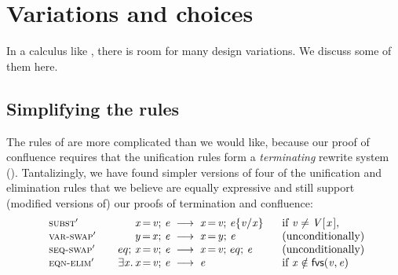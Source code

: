 \documentclass[acmsmall]{acmart}
\newcommand{\Conid}[1]{\mathit{#1}}
\newcommand{\Varid}[1]{\mathit{#1}}
\newcommand{\vs}{\emph{vs.}\xspace}
\newcommand{\lennart}[1]{{\color{dkcyan} [{LA}: #1]}}
\newcommand{\lennart}[1]{}
\begin{document}

\section{Variations and choices} \label{sec:variations}


In a calculus like \versecalc{}, there is room for many design variations.
We discuss some of them here.

\subsection{Simplifying the rules} \label{sec:simpler}

The rules of  are more complicated than we would like, because our
proof of confluence requires that the unification rules form a \emph{terminating}
rewrite system ().  Tantalizingly, we have
found simpler versions of four of the unification and elimination rules that
we believe are equally expressive and still support (modified
versions of) our proofs of termination and confluence:
$$
\begin{array}{@{\hskip0.5em}l@{\qquad}r @{\;\;}c@{\;\;}l@{\qquad}l@{}}
  \rulename{subst${}'$} & \ensuremath{\Varid{x}\hspace{-0.14em}=\hspace{-0.14em}\Varid{v};\,\Varid{e}} & \movesto & \ensuremath{\Varid{x}\hspace{-0.14em}=\hspace{-0.14em}\Varid{v};\,\subst{\Varid{e}}{\Varid{x}}{\Varid{v}}} \hspace*{-0.3em}
  & \text{if $\ensuremath{\Varid{v}} \not= \ensuremath{\Conid{V} [\mskip1.5mu \Varid{x}\mskip1.5mu]}$}, \\
  \rulename{var-swap${}'$} & \ensuremath{\Varid{y}\hspace{-0.14em}=\hspace{-0.14em}\Varid{x};\,\Varid{e}}    & \movesto & \ensuremath{\Varid{x}\hspace{-0.14em}=\hspace{-0.14em}\Varid{y};\,\Varid{e}} & \text{(unconditionally)} \\
  \rulename{seq-swap${}'$} & \ensuremath{eq;\,\Varid{x}\hspace{-0.14em}=\hspace{-0.14em}\Varid{v};\,\Varid{e}} & \movesto & \ensuremath{\Varid{x}\hspace{-0.14em}=\hspace{-0.14em}\Varid{v};\,eq;\,\Varid{e}} &
                      \text{(unconditionally)} \\
\rulename{eqn-elim${}'$} & \ensuremath{\exists\Varid{x}.\,\Varid{x}\hspace{-0.14em}=\hspace{-0.14em}\Varid{v};\,\Varid{e}} & \movesto & \ensuremath{\Varid{e}} & \text{if $\ensuremath{\Varid{x}} \notin \freevars{\ensuremath{\Varid{v}},\ensuremath{\Varid{e}}}$} \\
\end{array}
$$
\end{document}
